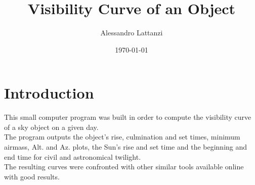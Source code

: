 \documentclass[a4paper]{article}
\title{Visibility Curve of an Object}
\author{Alessandro Lattanzi}
\date{\today}
\begin{document}
\maketitle
	
	\section{Introduction}
		This small computer program was built in order to compute the visibility curve of a sky object on a given day.\\
		The program outputs the object's rise, culmination and set times, minimum airmass, Alt. and Az. plots, the Sun's rise and set time and the beginning and end time for civil and astronomical twilight.\\
		
		The resulting curves were confronted with other similar tools available online with good results.
	\vspace{0.035\textheight}
\end{document}
